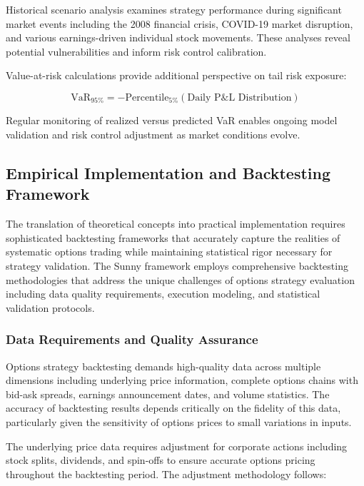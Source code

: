 \documentclass[
  american,
  11pt,
  11pt,
  letterpaper,
  onecolumn]{article}
\begin{document}
Historical scenario analysis examines strategy performance during
significant market events including the 2008 financial crisis, COVID-19
market disruption, and various earnings-driven individual stock
movements. These analyses reveal potential vulnerabilities and inform
risk control calibration.

Value-at-risk calculations provide additional perspective on tail risk
exposure:

\[\text{VaR}_{95\%} = -\text{Percentile}_{5\%}(\text{Daily P\&L Distribution})\]

Regular monitoring of realized versus predicted VaR enables ongoing
model validation and risk control adjustment as market conditions
evolve.

\subsection{Empirical Implementation and Backtesting
Framework}\label{empirical-implementation-and-backtesting-framework}

The translation of theoretical concepts into practical implementation
requires sophisticated backtesting frameworks that accurately capture
the realities of systematic options trading while maintaining
statistical rigor necessary for strategy validation. The Sunny framework
employs comprehensive backtesting methodologies that address the unique
challenges of options strategy evaluation including data quality
requirements, execution modeling, and statistical validation protocols.

\subsubsection{Data Requirements and Quality
Assurance}\label{data-requirements-and-quality-assurance}

Options strategy backtesting demands high-quality data across multiple
dimensions including underlying price information, complete options
chains with bid-ask spreads, earnings announcement dates, and volume
statistics. The accuracy of backtesting results depends critically on
the fidelity of this data, particularly given the sensitivity of options
prices to small variations in inputs.

The underlying price data requires adjustment for corporate actions
including stock splits, dividends, and spin-offs to ensure accurate
options pricing throughout the backtesting period. The adjustment
methodology follows:
\end{document}
